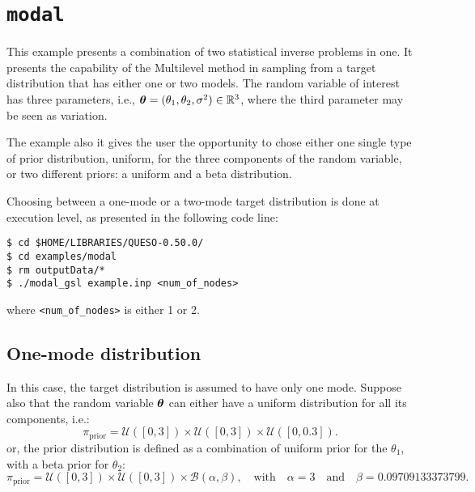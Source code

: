 \section{\texttt{modal}}\label{sec:example_modal}


This example presents a combination of two statistical inverse problems in one. 
It presents the capability of the Multilevel method in sampling from a target distribution that has either one or two models. The random variable of interest has three parameters, i.e., $\mbox{\boldmath$ \theta $}=(\theta_1,\theta_2, \sigma^2) \in \mathbb{R}^3$, where the third parameter may be seen as variation.

The example also it gives the user the opportunity to chose either one single type of prior distribution, uniform, for the three components of the random variable, or two different priors: a uniform and a beta distribution.

Choosing between a one-mode or a two-mode target distribution is done at execution level, as presented in the following code line:

\begin{lstlisting}[label={},caption={}]
$ cd $HOME/LIBRARIES/QUESO-0.50.0/
$ cd examples/modal
$ rm outputData/*
$ ./modal_gsl example.inp <num_of_nodes>
\end{lstlisting}
where \verb+<num_of_nodes>+ is either 1 or 2.
% 
% 
% 
% 
% 
% 
% 
% 
\subsection{One-mode distribution}

In this case, the target distribution is assumed to have only one mode.
Suppose also that the random variable $\mbox{\boldmath$ \theta $}$  can either have a uniform distribution for all its components, i.e.:
$$
\pi_{\text{prior}}=\mathcal{U}([0,3]) \times \mathcal{U}([0,3]) \times \mathcal{U}([0,0.3]).
$$
or, the prior distribution is defined as a combination of uniform prior for the $\theta_1$, with a beta prior for $\theta_2$:
$$
\pi_{\text{prior}}=\mathcal{U}([0,3]) \times \mathcal{U}([0,3]) \times \mathcal{B}(\alpha,\beta), \quad \text{with} \quad \alpha=3 \quad\text{and}\quad \beta=0.09709133373799.
$$

